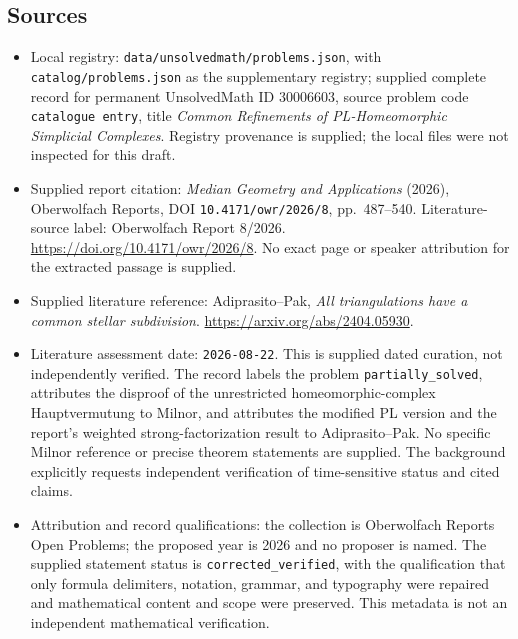 \documentclass[11pt]{article}
\begin{document}
\subsection{Sources}
\begin{itemize}
\item Local registry: \texttt{data/unsolvedmath/problems.json}, with \texttt{catalog/problems.json} as the supplementary registry; supplied complete record for permanent UnsolvedMath ID \(30006603\), source problem code \texttt{catalogue entry}, title \emph{Common Refinements of PL-Homeomorphic Simplicial Complexes}. Registry provenance is supplied; the local files were not inspected for this draft.
\item Supplied report citation: \emph{Median Geometry and Applications} (2026), Oberwolfach Reports, DOI \texttt{10.4171/owr/2026/8}, pp.\ 487--540. Literature-source label: Oberwolfach Report 8/2026. \url{https://doi.org/10.4171/owr/2026/8}. No exact page or speaker attribution for the extracted passage is supplied.
\item Supplied literature reference: Adiprasito--Pak, \emph{All triangulations have a common stellar subdivision}. \url{https://arxiv.org/abs/2404.05930}.
\item Literature assessment date: \texttt{2026-08-22}. This is supplied dated curation, not independently verified. The record labels the problem \texttt{partially\_solved}, attributes the disproof of the unrestricted homeomorphic-complex Hauptvermutung to Milnor, and attributes the modified PL version and the report's weighted strong-factorization result to Adiprasito--Pak. No specific Milnor reference or precise theorem statements are supplied. The background explicitly requests independent verification of time-sensitive status and cited claims.
\item Attribution and record qualifications: the collection is Oberwolfach Reports Open Problems; the proposed year is 2026 and no proposer is named. The supplied statement status is \texttt{corrected\_verified}, with the qualification that only formula delimiters, notation, grammar, and typography were repaired and mathematical content and scope were preserved. This metadata is not an independent mathematical verification.
\end{itemize}
\end{document}
